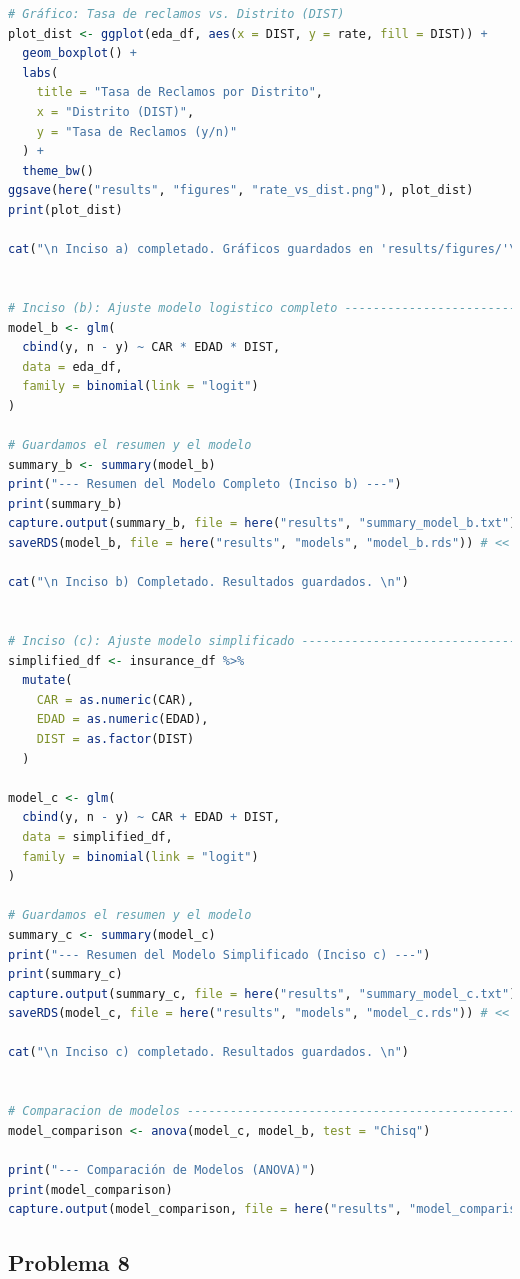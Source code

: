 \begin{lstlisting}[language=R, caption={Script: Reclamo polizas de seguros.}, label={lst:script8}]
# Gráfico: Tasa de reclamos vs. Distrito (DIST)
plot_dist <- ggplot(eda_df, aes(x = DIST, y = rate, fill = DIST)) +
  geom_boxplot() +
  labs(
    title = "Tasa de Reclamos por Distrito",
    x = "Distrito (DIST)",
    y = "Tasa de Reclamos (y/n)"
  ) +
  theme_bw()
ggsave(here("results", "figures", "rate_vs_dist.png"), plot_dist) 
print(plot_dist)

cat("\n Inciso a) completado. Gráficos guardados en 'results/figures/'\n")


# Inciso (b): Ajuste modelo logistico completo --------------------------------
model_b <- glm(
  cbind(y, n - y) ~ CAR * EDAD * DIST,
  data = eda_df,
  family = binomial(link = "logit")
)

# Guardamos el resumen y el modelo
summary_b <- summary(model_b)
print("--- Resumen del Modelo Completo (Inciso b) ---")
print(summary_b)
capture.output(summary_b, file = here("results", "summary_model_b.txt"))
saveRDS(model_b, file = here("results", "models", "model_b.rds")) # << CORREGIDO

cat("\n Inciso b) Completado. Resultados guardados. \n")


# Inciso (c): Ajuste modelo simplificado --------------------------------------
simplified_df <- insurance_df %>%
  mutate(
    CAR = as.numeric(CAR),
    EDAD = as.numeric(EDAD),
    DIST = as.factor(DIST)
  )

model_c <- glm(
  cbind(y, n - y) ~ CAR + EDAD + DIST,
  data = simplified_df,
  family = binomial(link = "logit")
)

# Guardamos el resumen y el modelo
summary_c <- summary(model_c)
print("--- Resumen del Modelo Simplificado (Inciso c) ---")
print(summary_c)
capture.output(summary_c, file = here("results", "summary_model_c.txt"))
saveRDS(model_c, file = here("results", "models", "model_c.rds")) # << CORREGIDO

cat("\n Inciso c) completado. Resultados guardados. \n")


# Comparacion de modelos ------------------------------------------------------
model_comparison <- anova(model_c, model_b, test = "Chisq")

print("--- Comparación de Modelos (ANOVA)")
print(model_comparison)
capture.output(model_comparison, file = here("results", "model_comparison_anova.txt"))

\end{lstlisting}

\clearpage

\subsection{Problema \textcolor{CIMATRed}{8}}

